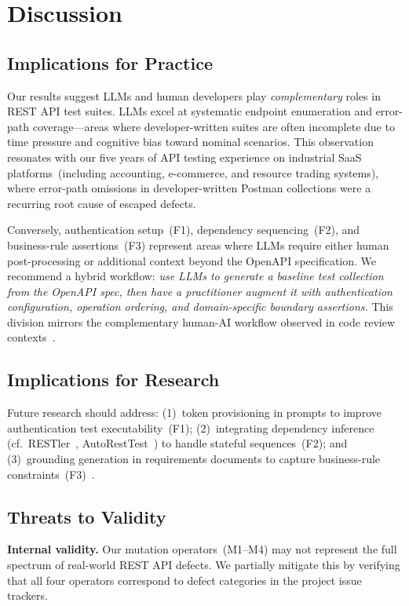 \documentclass[sigconf,review,anonymous=false]{acmart}
\begin{document}
\section{Discussion}\label{sec:discuss}

\subsection{Implications for Practice}\vspace{-2pt}
Our results suggest LLMs and human developers play \emph{complementary}
roles in REST API test suites. LLMs excel at systematic endpoint enumeration
and error-path coverage---areas where developer-written suites are often
incomplete due to time pressure and cognitive bias toward nominal scenarios.
This observation resonates with our five years of API testing experience on
industrial SaaS platforms~(including accounting, e-commerce, and resource
trading systems), where error-path omissions in developer-written Postman
collections were a recurring root cause of escaped defects.

Conversely, authentication setup~(F1), dependency sequencing~(F2), and
business-rule assertions~(F3) represent areas where LLMs require either
human post-processing or additional context beyond the OpenAPI specification.
We recommend a hybrid workflow: \emph{use LLMs to generate a baseline test
collection from the OpenAPI spec, then have a practitioner augment it with
authentication configuration, operation ordering, and domain-specific boundary
assertions.} This division mirrors the complementary human-AI workflow observed
in code review contexts~\cite{Alshahwan2024}.

\subsection{Implications for Research}\vspace{-2pt}
Future research should address: (1)~token provisioning in prompts to improve
authentication test executability~(F1); (2)~integrating dependency inference (cf.\
RESTler~\cite{Atlidakis2019}, AutoRestTest~\cite{Stennett2025}) to handle stateful
sequences~(F2); and (3)~grounding generation in requirements documents to capture
business-rule constraints~(F3)~\cite{Pereira2024}.

\subsection{Threats to Validity}\vspace{-2pt}
\textbf{Internal validity.} Our mutation operators~(M1--M4) may not represent
the full spectrum of real-world REST API defects. We partially mitigate this
by verifying that all four operators correspond to defect categories
in the project issue trackers.
\end{document}
